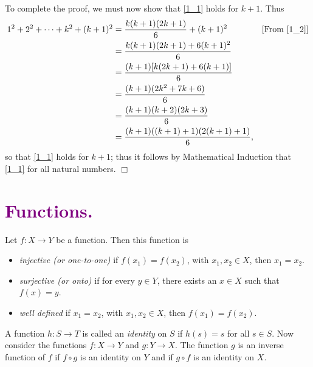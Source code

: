 \documentclass[9pt]{article}
\newcommand{\qed}{\hfill \ensuremath{\Box}}
\begin{document}
   To complete the proof, we must now show that \eqref{1_1} holds for $k + 1$.
   Thus
   \begin{align*}
      1^2 + 2^2 + \cdots + k^2 + (k+1)^2 &= \frac{k(k+1)(2k+1)}{6} + (k+1)^2
         &[\text{From }\eqref{1_2}]\\
         &= \frac{k(k+1)(2k+1) + 6(k+1)^2}{6} \\
         &= \frac{(k+1)[k(2k+1) + 6(k+1)]}{6} \\
         &= \frac{(k+1)(2k^2+7k+6)}{6} \\
         &= \frac{(k+1)(k+2)(2k+3)}{6} \\
         &= \frac{(k+1)((k+1)+1)(2(k+1)+1)}{6},
   \end{align*}
   so that \eqref{1_1} holds for $k + 1$; thus it follows by Mathematical
   Induction that \eqref{1_1} for all natural numbers. \qed

   \section*{\textcolor{purple}{Functions.}} Let $f : X \rightarrow Y$ be a 
   function. Then this function is
   \begin{itemize}
      \item \textit{injective (or one-to-one)} if $f(x_1) = f(x_2)$, with
            $x_1, x_2 \in X$, then $x_1 = x_2$.
      \item \textit{surjective (or onto)} if for every $y \in Y$, there exists
            an $x \in X$ such that $f(x) = y$.
      \item \textit{well defined} if $x_1 = x_2$, with $x_1, x_2 \in X$, then
            $f(x_1) = f(x_2)$.
   \end{itemize}

   A function $h : S \rightarrow T$ is called an \textit{identity} on $S$ if
   $h(s) = s$ for all $s \in S$. Now consider the functions
   $f : X \rightarrow Y$ and $g : Y \rightarrow X$. The function $g$ is an
   inverse function of $f$ if $f \circ g$ is an identity on $Y$ and if
   $g \circ f$ is an identity on $X$.
\end{document}
